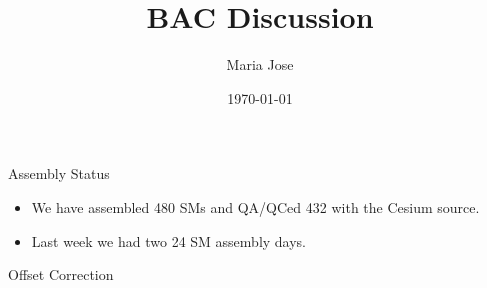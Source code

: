 \documentclass{beamer}
\title [BAC Discussion]{ BAC Discussion}
\author[Maria Jose]{Maria Jose}
\date{\today}
\institute[UVA]{University of Virginia}
\begin{document}
\maketitle
\begin{frame}{Assembly Status}
\begin{itemize}
    \item We have assembled 480 SMs and QA/QCed 432 with the Cesium source.
    \item Last week we had two 24 SM assembly days.
\end{itemize}
    
\end{frame}
\begin{frame}{Offset Correction}
    
\end{frame}
\end{document}
